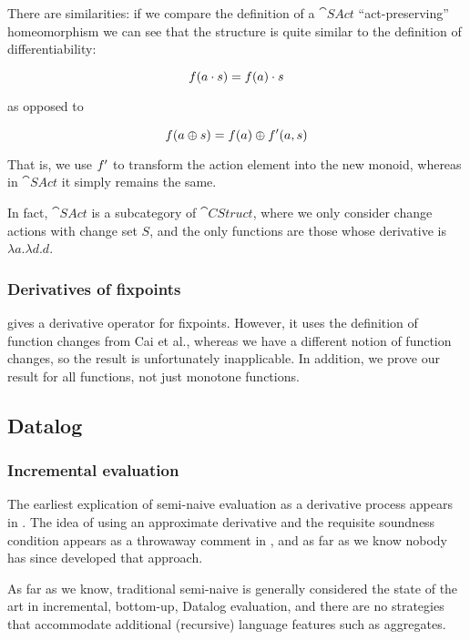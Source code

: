 There are similarities: if we compare the definition of a $\cat{SAct}$ ``act-preserving''
homeomorphism \autocite[See][]{kilp2000monoids} we can see that the structure is
quite similar to the definition of differentiability:

$$f(a \cdot s) = f(a) \cdot s$$

as opposed to

$$f(a \oplus s) = f(a) \oplus f'(a, s)$$

That is, we use $f'$ to transform the action element into the new
monoid, whereas in $\cat{SAct}$ it simply remains the same.

In fact, $\cat{SAct}$ is a subcategory of $\cat{CStruct}$, where we only
consider change actions with change set $S$, and the only functions are those
whose derivative is $\lambda a. \lambda d. d$.

\subsubsection{Derivatives of fixpoints}

\textcite{arntz2017fixpoints} gives a derivative operator for fixpoints. However,
it uses the definition of function changes from Cai et al., whereas
we have a different notion of function changes, so the result is unfortunately
inapplicable. In addition, we prove our result for all functions, not just
monotone functions.

\subsection{Datalog}

\subsubsection{Incremental evaluation}

The earliest explication of semi-naive evaluation as a derivative process
appears in \textcite{bancilhon1986naive}. The idea of using an approximate derivative
and the requisite soundness condition appears as a throwaway comment in
\textcite[][section 3.2.2]{bancilhon1986amateur}, and as far as we know nobody has since
developed that approach.

As far as we know, traditional semi-naive is generally considered the state of
the art in incremental, bottom-up, Datalog evaluation, and there are no strategies that
accommodate additional (recursive) language features such as aggregates.

